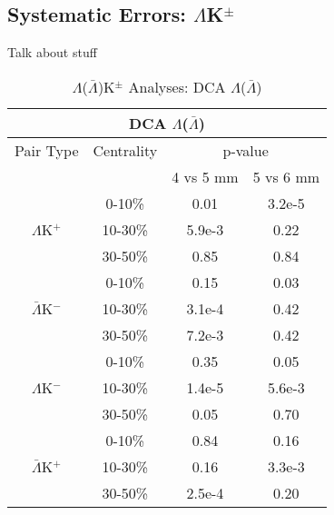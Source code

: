 \documentclass[../AnalysisNoteJBuxton.tex]{subfiles}
\begin{document}
\subsection{Systematic Errors: \texorpdfstring{$\Lambda$K$^{\pm}$}{TEXT}}
\label{SysErrsLamKch}

Talk about stuff

\begin{table}
 \centering
 \begin{tabular}{|c|c|c|c|}
 \multicolumn{4}{c}{DCA $\Lambda$($\bar{\Lambda}$)} \\
  \hline
  Pair Type & Centrality & \multicolumn{2}{c|}{p-value} \\
  \cline{3-4}
   & & 4 vs 5 mm & 5 vs 6 mm \\
  \hline
   & 0-10\% & 0.01 & 3.2e-5 \\
  $\Lambda$K$^{+}$ 
   & 10-30\% & 5.9e-3 & 0.22 \\
   & 30-50\% & 0.85 & 0.84 \\
  \hline
   & 0-10\% & 0.15 & 0.03 \\
  $\bar{\Lambda}$K$^{-}$ 
   & 10-30\% & 3.1e-4 & 0.42 \\
   & 30-50\% & 7.2e-3 & 0.42 \\
  \hline \hline
   & 0-10\% & 0.35 & 0.05 \\
  $\Lambda$K$^{-}$ 
   & 10-30\% & 1.4e-5 & 5.6e-3 \\
   & 30-50\% & 0.05 & 0.70 \\
  \hline
   & 0-10\% & 0.84 & 0.16 \\
  $\bar{\Lambda}$K$^{+}$ 
   & 10-30\% & 0.16 & 3.3e-3 \\
   & 30-50\% & 2.5e-4 & 0.20 \\
  \hline
 \end{tabular}
 \caption{$\Lambda$($\bar{\Lambda}$)K$^{\pm}$ Analyses: DCA $\Lambda$($\bar{\Lambda}$)}
 \label{tab:V0DcaLamKch}
\end{table}
\end{document}
